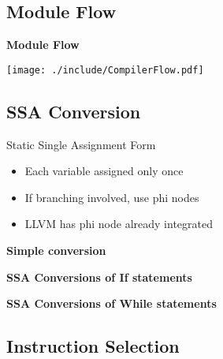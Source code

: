 \documentclass{beamer}
\begin{document}
\subsection{Module Flow}

\begin{frame}{\bf Module Flow}
  \begin{center}
    \texttt{[image: ./include/CompilerFlow.pdf]}
  \end{center}
\end{frame}


\subsection{SSA Conversion}

\begin{frame}{Static Single Assignment Form}
  \begin{itemize}
  \item<1->Each variable assigned only once
  \item<2->If branching involved, use phi nodes
  \item<3->LLVM has phi node already integrated
  \end{itemize}
\end{frame}

\begin{frame}{\bf Simple conversion}
  
\pause
  
\end{frame}

\begin{frame}[shrink]{\bf SSA Conversions of If statements}
  
\pause
  
\end{frame}

\begin{frame}[shrink]{\bf SSA Conversions of While statements}
  
\pause
  
\end{frame}

\subsection{Instruction Selection}
\end{document}
